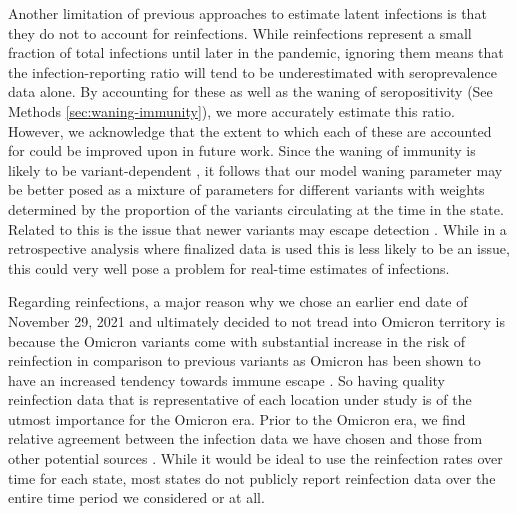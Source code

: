 \documentclass{article}
\begin{document}
Another limitation of previous approaches to estimate latent infections is
that they do not to account for reinfections. While
reinfections represent a small fraction of total infections until
later in the pandemic, ignoring them means that the
infection-reporting ratio will tend to be underestimated with seroprevalence
data alone. By accounting for these as well as the waning of seropositivity (See
Methods \autoref{sec:waning-immunity}), we more accurately estimate this ratio.
However, we acknowledge that the extent to which each of these are
accounted for could be improved upon in future work. 
Since the waning of immunity is likely to be variant-dependent
\citep{pooley2023durability}, it follows that our model waning parameter may be
better posed as a mixture of parameters for different variants with weights
determined by the proportion of the variants circulating at the time in the
state. Related to this is the issue that newer variants may escape detection
\citep{nih2022assessing, fda2023sars}. While in a retrospective analysis where
finalized data is used this is less likely to be an issue, this could very well
pose a problem for real-time estimates of infections.

Regarding reinfections, a major reason why we chose an earlier end date of November 29,
2021 and ultimately decided to not tread into Omicron territory is because the
Omicron variants come with substantial increase in the risk of reinfection in
comparison to previous variants as Omicron has been shown to have an increased
tendency towards immune escape \citep{wei2024risk, pulliam2022increased,
eythorsson2022rate}. So having quality reinfection data that is representative
of each location under study is of the utmost importance for the Omicron era. 
Prior to the Omicron era, we find relative agreement between the infection data
we have chosen and those from other potential sources \citep{ruff2022rapid, nyreinfect2021, hireinfect2022, wareinfect2022}.
While it would be ideal to use the reinfection rates over time for each \US state,
most states do not publicly report reinfection data over the entire time period we considered or at all.
\end{document}
